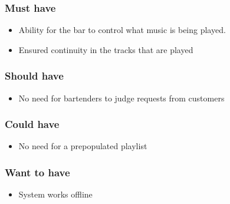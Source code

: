 \subsubsection{Must have}
\begin{itemize}
        \item Ability for the bar to control what music is being played.
        \item Ensured continuity in the tracks that are played
\end{itemize}
\subsubsection{Should have}
\begin{itemize}
        \item No need for bartenders to judge requests from customers
\end{itemize}
\subsubsection{Could have}
\begin{itemize}
        \item No need for a prepopulated playlist
\end{itemize}
\subsubsection{Want to have}
\begin{itemize}
        \item System works offline
\end{itemize}
